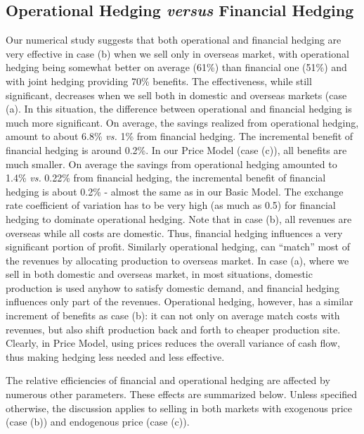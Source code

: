 \documentclass[mnsc,nonblindrev,copyedit]{informs2_wz} %
\begin{document}
\subsection{Operational Hedging {\it versus} Financial Hedging}

Our numerical study suggests that both operational and financial hedging are very effective in case (b) when we sell only in overseas market, with operational hedging being somewhat better on average (61\%) than financial one (51\%) and with joint hedging providing 70\% benefits.  The effectiveness, while still significant, decreases when we sell both in domestic and overseas markets (case (a).  In this situation, the difference between operational and financial hedging is much more significant.  On average, the savings realized from operational hedging, amount to about 6.8\% {\it vs.} \hspace{-0.07in}1\% from financial hedging.  The incremental benefit of financial hedging is around 0.2\%.  In our Price Model (case (c)), all benefits are much smaller.  On average the savings from operational hedging amounted to 1.4\% {\it vs.} 0.22\% from financial hedging, the incremental benefit of financial hedging is about 0.2\% - almost the same as in our Basic Model.  The exchange rate coefficient of variation has to be very high (as much as 0.5) for financial hedging to dominate operational hedging.  Note that in case (b), all revenues are overseas while all costs are domestic.  Thus, financial hedging influences a very significant portion of profit.  Similarly operational hedging, can ``match'' most of the revenues by allocating production to overseas market.  In case (a), where we sell in both domestic and overseas market, in most situations, domestic production is used anyhow to satisfy domestic demand, and financial hedging influences only part of the revenues.  Operational hedging, however, has a similar increment of benefits as case (b): it can not only on average match costs with revenues, but also shift production back and forth to cheaper production site.  Clearly, in Price Model, using prices reduces the overall variance of cash flow, thus making hedging less needed and less effective.



The relative efficiencies of financial and operational hedging are affected by numerous other parameters.  These effects are summarized below.  Unless specified otherwise, the discussion applies to selling in both markets with exogenous price (case (b)) and endogenous price (case (c)).
\end{document}
